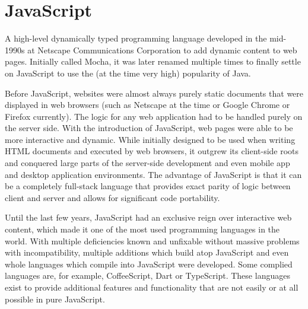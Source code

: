 \section{JavaScript}
A high-level dynamically typed programming language developed in the mid-1990s at Netscape Communications Corporation to add dynamic content to web pages. Initially called Mocha, it was later renamed multiple times to finally settle on JavaScript to use the (at the time very high) popularity of Java.\par
Before JavaScript, websites were almost always purely static documents that were displayed in web browsers (such as Netscape at the time or Google Chrome or Firefox currently). The logic for any web application had to be handled purely on the server side. With the introduction of JavaScript, web pages were able to be more interactive and dynamic. While initially designed to be used when writing HTML documents and executed by web browsers, it outgrew its client-side roots and conquered large parts of the server-side development and even mobile app and desktop application environments. The advantage of JavaScript is that it can be a completely full-stack language that provides exact parity of logic between client and server and allows for significant code portability.\par
Until the last few years, JavaScript had an exclusive reign over interactive web content, which made it one of the most used programming languages in the world. With multiple deficiencies known and unfixable without massive problems with incompatibility, multiple additions which build atop JavaScript and even whole languages which compile into JavaScript were developed. Some complied languages are, for example, CoffeeScript, Dart or TypeScript. These languages exist to provide additional features and functionality that are not easily or at all possible in pure JavaScript.\par


